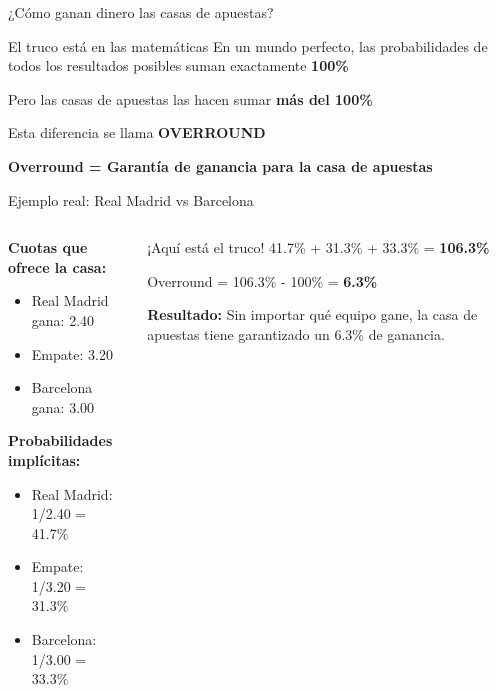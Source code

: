 \documentclass[aspectratio=169]{beamer}
\begin{document}
\begin{frame}{¿Cómo ganan dinero las casas de apuestas?}
\begin{block}{El truco está en las matemáticas}
\large
En un mundo perfecto, las probabilidades de todos los resultados posibles suman exactamente \textbf{100\%}

\vspace{0.3cm}
Pero las casas de apuestas las hacen sumar \textcolor{rojocomplementario}{\textbf{más del 100\%}}

\vspace{0.3cm}
Esta diferencia se llama \textcolor{azulprincipai}{\textbf{OVERROUND}}
\end{block}

\vspace{0.5cm}
\begin{center}
\textbf{Overround = Garantía de ganancia para la casa de apuestas}
\end{center}
\end{frame}

\begin{frame}{Ejemplo real: Real Madrid vs Barcelona}
\begin{columns}
\begin{column}{0.5\textwidth}
\textbf{Cuotas que ofrece la casa:}
\begin{itemize}
\item Real Madrid gana: 2.40
\item Empate: 3.20  
\item Barcelona gana: 3.00
\end{itemize}

\vspace{0.5cm}
\textbf{Probabilidades implícitas:}
\begin{itemize}
\item Real Madrid: 1/2.40 = 41.7\%
\item Empate: 1/3.20 = 31.3\%
\item Barcelona: 1/3.00 = 33.3\%
\end{itemize}
\end{column}
\begin{column}{0.5\textwidth}
\begin{alertblock}{¡Aquí está el truco!}
\Large
41.7\% + 31.3\% + 33.3\% = \textcolor{rojocomplementario}{\textbf{106.3\%}}

\vspace{0.3cm}
Overround = 106.3\% - 100\% = \textcolor{azulprincipai}{\textbf{6.3\%}}
\end{alertblock}

\vspace{0.3cm}
\textbf{Resultado:} Sin importar qué equipo gane, la casa de apuestas tiene garantizado un 6.3\% de ganancia.
\end{column}
\end{columns}
\end{frame}
\end{document}
